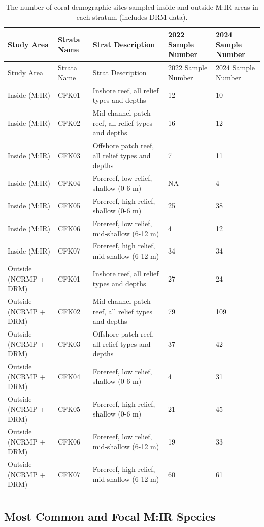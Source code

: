 \documentclass[
]{article}
\begin{document}
\begin{longtable}[]{@{}lllll@{}}
\caption{The number of coral demographic sites sampled inside and
outside M:IR areas in each stratum (includes DRM data).}\tabularnewline
\toprule()
Study Area & Strata Name & Strat Description & 2022 Sample Number & 2024
Sample Number \\
\midrule()
\endfirsthead
\toprule()
Study Area & Strata Name & Strat Description & 2022 Sample Number & 2024
Sample Number \\
\midrule()
\endhead
Inside (M:IR) & CFK01 & Inshore reef, all relief types and depths & 12 &
10 \\
Inside (M:IR) & CFK02 & Mid-channel patch reef, all relief types and
depths & 16 & 12 \\
Inside (M:IR) & CFK03 & Offshore patch reef, all relief types and depths
& 7 & 11 \\
Inside (M:IR) & CFK04 & Forereef, low relief, shallow (0-6 m) & NA &
4 \\
Inside (M:IR) & CFK05 & Forereef, high relief, shallow (0-6 m) & 25 &
38 \\
Inside (M:IR) & CFK06 & Forereef, low relief, mid-shallow (6-12 m) & 4 &
12 \\
Inside (M:IR) & CFK07 & Forereef, high relief, mid-shallow (6-12 m) & 34
& 34 \\
Outside (NCRMP + DRM) & CFK01 & Inshore reef, all relief types and
depths & 27 & 24 \\
Outside (NCRMP + DRM) & CFK02 & Mid-channel patch reef, all relief types
and depths & 79 & 109 \\
Outside (NCRMP + DRM) & CFK03 & Offshore patch reef, all relief types
and depths & 37 & 42 \\
Outside (NCRMP + DRM) & CFK04 & Forereef, low relief, shallow (0-6 m) &
4 & 31 \\
Outside (NCRMP + DRM) & CFK05 & Forereef, high relief, shallow (0-6 m) &
21 & 45 \\
Outside (NCRMP + DRM) & CFK06 & Forereef, low relief, mid-shallow (6-12
m) & 19 & 33 \\
Outside (NCRMP + DRM) & CFK07 & Forereef, high relief, mid-shallow (6-12
m) & 60 & 61 \\
& & & & \\
\bottomrule()
\end{longtable}

\hypertarget{most-common-and-focal-mir-species}{%
\subsection{Most Common and Focal M:IR
Species}\label{most-common-and-focal-mir-species}}
\end{document}

